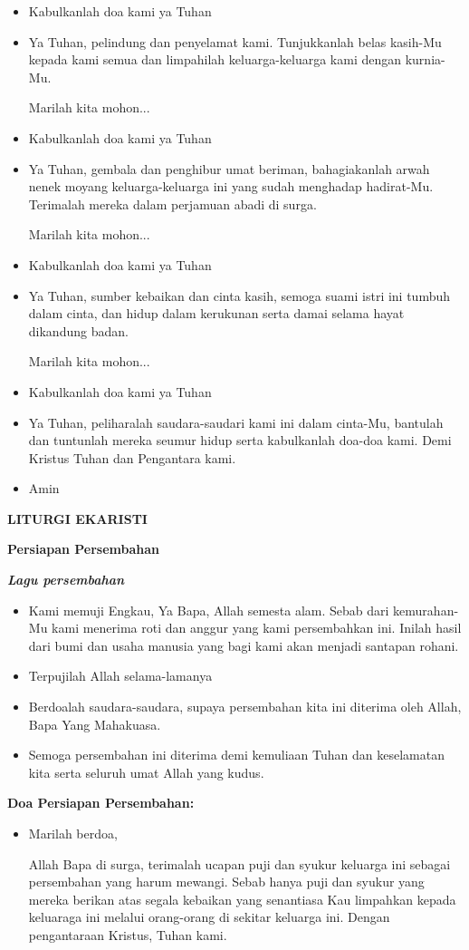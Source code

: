 \documentclass[a5paper,headsepline,titlepage,10pt]{scrbook}
\makeatletter
\newcommand{\judul}[1]{%
  {\parindent \z@ \centering \normalfont
    \interlinepenalty\@M \Large \bfseries #1\par\nobreak \vskip 20\p@ }}
\newcommand{\subjudul}[1]{%
  {\parindent \z@ \normalfont
    \interlinepenalty\@M \bfseries #1\par\nobreak \vskip 20\p@ }}
\newcommand{\lagu}[1]{%
  {\parindent \z@ \normalfont
    \interlinepenalty\@M \bfseries \emph{#1}\par\nobreak \vskip 20\p@ }}
\newcommand{\BU}[1]{\begin{itemize} \item[U:] #1 \end{itemize}}
\newcommand{\BI}[1]{\begin{itemize} \item[I:] #1 \end{itemize}}
\newcommand{\BP}[1]{\begin{itemize} \item[P:] #1 \end{itemize}}
\makeatother
\begin{document}
\BU{Kabulkanlah doa kami ya Tuhan}


\BP{Ya Tuhan, pelindung dan penyelamat kami. Tunjukkanlah belas kasih-Mu kepada kami semua dan limpahilah  keluarga-keluarga kami dengan kurnia-Mu. 


Marilah kita mohon...}

\BU{Kabulkanlah doa kami ya Tuhan}

\BP{Ya Tuhan, gembala dan penghibur umat beriman, bahagiakanlah arwah nenek moyang keluarga-keluarga ini yang sudah menghadap hadirat-Mu. Terimalah mereka dalam perjamuan abadi di surga. 


Marilah kita mohon...}

\BU{Kabulkanlah doa kami ya Tuhan}

\BP{Ya Tuhan, sumber kebaikan dan cinta kasih, semoga suami istri ini tumbuh dalam cinta, dan hidup dalam kerukunan serta damai selama hayat dikandung badan. 


Marilah kita mohon...}

\BU{Kabulkanlah doa kami ya Tuhan}

\BI{Ya Tuhan, peliharalah saudara-saudari kami ini dalam cinta-Mu, bantulah dan
tuntunlah mereka seumur hidup serta kabulkanlah doa-doa kami. Demi Kristus Tuhan
dan Pengantara kami.}

\BU{Amin}

\judul{LITURGI EKARISTI}

\subjudul{Persiapan Persembahan}

\lagu{Lagu persembahan}

\BI{Kami memuji Engkau, Ya Bapa, Allah semesta alam. Sebab dari kemurahan-Mu kami menerima roti dan anggur yang kami persembahkan ini. Inilah hasil dari bumi dan usaha manusia yang bagi kami akan menjadi santapan rohani.}

\BU{Terpujilah Allah selama-lamanya}

\BI{Berdoalah saudara-saudara, supaya persembahan kita ini diterima oleh Allah, Bapa Yang Mahakuasa.}

\BU{Semoga persembahan ini diterima demi kemuliaan Tuhan dan keselamatan kita serta seluruh umat Allah yang kudus.}

\subjudul{Doa Persiapan Persembahan:}

\BI{Marilah berdoa,

Allah Bapa di surga, terimalah ucapan puji dan syukur keluarga ini sebagai persembahan yang harum mewangi. Sebab hanya puji dan syukur yang mereka berikan atas segala kebaikan yang senantiasa Kau limpahkan kepada keluaraga ini melalui orang-orang di sekitar keluarga ini. Dengan pengantaraan Kristus, Tuhan kami.}
\end{document}
